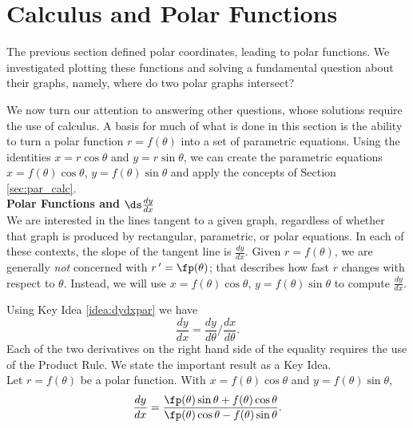 \section{Calculus and Polar Functions} \label{sec:polarcalc}
The previous section defined polar coordinates, leading to polar functions. We investigated plotting these functions and solving a fundamental question about their graphs, namely, where do two polar graphs intersect?

We now turn our attention to answering other questions, whose solutions require the use of calculus. A basis for much of what is done in this section is the ability to turn a polar function $r=f(\theta)$ into a set of parametric equations. Using the identities $x=r\cos \theta$ and $y=r\sin \theta$, we can create the parametric equations $x=f(\theta)\cos\theta$, $y=f(\theta)\sin\theta$ and apply the concepts of Section \ref{sec:par_calc}.\\

\noindent\textbf{\large Polar Functions and $\ds \frac{dy}{dx}$}\\

We are interested in the lines tangent to a given graph, regardless of whether that graph is produced by rectangular, parametric, or polar equations. In each of these contexts, the slope of the tangent line is $\frac{dy}{dx}$. Given $r=f(\theta)$, we are generally \textit{not} concerned with $r\,'=\fp(\theta)$; that describes how fast $r$ changes with respect to $\theta$. Instead, we will use $x=f(\theta)\cos\theta$, $y=f(\theta)\sin\theta$ to compute $\frac{dy}{dx}$. 

Using Key Idea \ref{idea:dydxpar} we have $$\frac{dy}{dx} = \frac{dy}{d\theta}\Big/\frac{dx}{d\theta}.$$ Each of the two derivatives on the right hand side of the equality requires the use of the Product Rule. We state the important result as a Key Idea.\\

{Let $r=f(\theta)$ be a polar function. With $x=f(\theta)\cos\theta$ and $y=f(\theta)\sin\theta$,
$$\frac{dy}{dx} = \frac{\fp(\theta)\sin\theta+f(\theta)\cos\theta}{\fp(\theta)\cos\theta-f(\theta)\sin\theta}.$$
}


